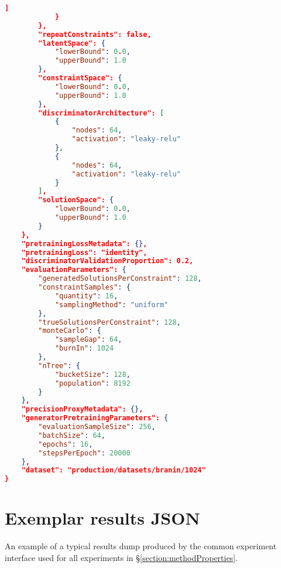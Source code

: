 \documentclass[../main.tex]{subfiles}
\begin{document}
\begin{lstlisting}[language=json,firstnumber=1,caption={Experimental parameters for training a generator on the constrained Branin function environment.},captionpos=b]
                ]
            }
        },
        "repeatConstraints": false,
        "latentSpace": {  
            "lowerBound": 0.0,
            "upperBound": 1.0
        },
        "constraintSpace": {  
            "lowerBound": 0.0,
            "upperBound": 1.0
        },
        "discriminatorArchitecture": [  
            {  
                "nodes": 64,
                "activation": "leaky-relu"
            },
            {  
                "nodes": 64,
                "activation": "leaky-relu"
            }
        ],
        "solutionSpace": {  
            "lowerBound": 0.0,
            "upperBound": 1.0
        }
    },
    "pretrainingLossMetadata": {},
    "pretrainingLoss": "identity",
    "discriminatorValidationProportion": 0.2,
    "evaluationParameters": {  
        "generatedSolutionsPerConstraint": 128,
        "constraintSamples": {  
            "quantity": 16,
            "samplingMethod": "uniform"
        },
        "trueSolutionsPerConstraint": 128,
        "monteCarlo": {  
            "sampleGap": 64,
            "burnIn": 1024
        },
        "nTree": {  
            "bucketSize": 128,
            "population": 8192
        }
    },
    "precisionProxyMetadata": {},
    "generatorPretrainingParameters": {  
        "evaluationSampleSize": 256,
        "batchSize": 64,
        "epochs": 16,
        "stepsPerEpoch": 20000
    },
    "dataset": "production/datasets/branin/1024"
}
\end{lstlisting}

\section{Exemplar results JSON} \label{appendix:exampleJSON}

An example of a typical results dump produced by the common experiment interface used for all experiments in \S\ref{section:methodProperties}.
\end{document}
